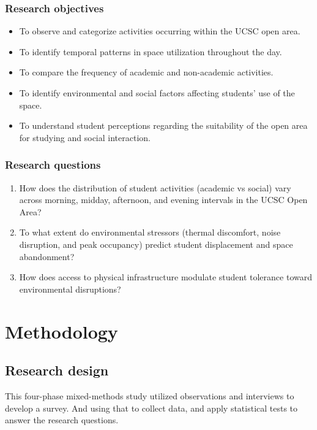 \documentclass[12pt, a4paper]{report}
\begin{document}
\subsection{Research objectives}
\begin{itemize}
    \item To observe and categorize activities occurring within the UCSC open area.
    
    \item To identify temporal patterns in space utilization throughout the day.
    
    \item To compare the frequency of academic and non-academic activities.
    
    \item To identify environmental and social factors affecting students' use of the space.
    
    \item To understand student perceptions regarding the suitability of the open area for studying and social interaction.
\end{itemize}

\subsection{Research questions}
\begin{enumerate}
    \item How does the distribution of student activities (academic vs social) vary across morning, midday, afternoon, and evening intervals in the UCSC Open Area?
    \item To what extent do environmental stressors (thermal discomfort, noise disruption, and peak occupancy) predict student displacement and space abandonment?
    \item How does access to physical infrastructure modulate student tolerance toward environmental disruptions?
\end{enumerate}

\newpage

\chapter{Methodology}

\section{Research design}
This four-phase mixed-methods study utilized observations and interviews to develop a survey. And using that to collect data, and apply statistical tests to answer the research questions.
\end{document}
